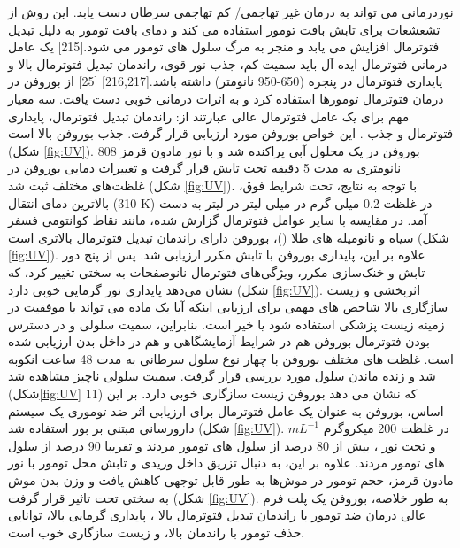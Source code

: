نوردرمانی می تواند به درمان غیر تهاجمی/ کم تهاجمی سرطان دست یابد. این روش از تشعشعات  برای تابش بافت تومور استفاده می کند و دمای بافت تومور به دلیل تبدیل فتوترمال افزایش می یابد و منجر به مرگ سلول های تومور می شود.\cite{prasadMechanismCellDeath2007}[215] یک عامل درمانی فتوترمال ایده آل باید سمیت کم، جذب نور قوی، راندمان تبدیل فتوترمال بالا و پایداری فتوترمال در پنجره  (650-950 نانومتر) داشته باشد.\cite{jangGoldNanorodPhotosensitizerComplex2011, chengPEGylatedWS2Nanosheets2014}[216,217] \cite{jiNovelTopDownSynthesis2018}[25] از بوروفن در درمان فتوترمال تومورها استفاده کرد و به اثرات درمانی خوبی دست یافت. سه معیار مهم برای یک عامل فتوترمال عالی عبارتند از: راندمان تبدیل فتوترمال، پایداری فتوترمال و جذب . این خواص بوروفن مورد ارزیابی قرار گرفت. جذب  بوروفن بالا است (شکل \ref{fig:UV}). بوروفن در یک محلول آبی پراکنده شد و با نور مادون قرمز 808 نانومتری  به مدت 5 دقیقه تحت تابش قرار گرفت و تغییرات دمایی بوروفن در غلظت‌های مختلف ثبت شد (شکل \ref{fig:UV}). با توجه به نتایج، تحت شرایط فوق، بالاترین دمای انتقال (310 K) در غلظت 0.2 میلی گرم در میلی لیتر در لیتر به دست آمد. در مقایسه با سایر عوامل فتوترمال گزارش شده، مانند نقاط کوانتومی فسفر سیاه  و نانومیله های طلا ()، بوروفن دارای راندمان تبدیل فتوترمال بالاتری  است (شکل \ref{fig:UV}). علاوه بر این، پایداری بوروفن با تابش مکرر  ارزیابی شد. پس از پنج دور تابش و خنک‌سازی مکرر، ویژگی‌های فتوترمال نانوصفحات به سختی تغییر کرد، که نشان می‌دهد پایداری نور گرمایی خوبی دارد (شکل \ref{fig:UV}). اثربخشی و زیست سازگاری بالا شاخص های مهمی برای ارزیابی اینکه آیا یک ماده می تواند با موفقیت در زمینه زیست پزشکی استفاده شود یا خیر است. بنابراین، سمیت سلولی و در دسترس بودن فتوترمال بوروفن هم در شرایط آزمایشگاهی و هم در داخل بدن ارزیابی شده است. غلظت های مختلف بوروفن با چهار نوع سلول سرطانی به مدت 48 ساعت انکوبه شد و زنده ماندن سلول مورد بررسی قرار گرفت. سمیت سلولی ناچیز مشاهده شد (شکل\ref{fig:UV} 11) که نشان می دهد بوروفن زیست سازگاری خوبی دارد. بر این اساس، بوروفن به عنوان یک عامل فتوترمال برای ارزیابی اثر ضد توموری یک سیستم دارورسانی مبتنی بر بور استفاده شد (شکل \ref{fig:UV}). در غلظت  200 میکروگرم $mL^{-1}$ و تحت نور ، بیش از 80 درصد از سلول های تومور  مردند و تقریبا 90 درصد از سلول های تومور  مردند. علاوه بر این، به دنبال تزریق داخل وریدی  و تابش محل تومور با نور مادون قرمز، حجم تومور در موش‌ها به طور قابل توجهی کاهش یافت و وزن بدن موش به سختی تحت تاثیر قرار گرفت (شکل \ref{fig:UV}). به طور خلاصه، بوروفن یک پلت فرم عالی درمان ضد تومور با راندمان تبدیل فتوترمال بالا ، پایداری گرمایی بالا، توانایی حذف تومور با راندمان بالا، و زیست سازگاری خوب است.
